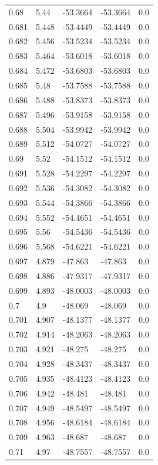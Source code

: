 \begin{table}[H]
\begin{tabular}{lllll}
0.68 & 5.44 & -53.3664 & -53.3664 & 0.0 \\
0.681 & 5.448 & -53.4449 & -53.4449 & 0.0 \\
0.682 & 5.456 & -53.5234 & -53.5234 & 0.0 \\
0.683 & 5.464 & -53.6018 & -53.6018 & 0.0 \\
0.684 & 5.472 & -53.6803 & -53.6803 & 0.0 \\
0.685 & 5.48 & -53.7588 & -53.7588 & 0.0 \\
0.686 & 5.488 & -53.8373 & -53.8373 & 0.0 \\
0.687 & 5.496 & -53.9158 & -53.9158 & 0.0 \\
0.688 & 5.504 & -53.9942 & -53.9942 & 0.0 \\
0.689 & 5.512 & -54.0727 & -54.0727 & 0.0 \\
0.69 & 5.52 & -54.1512 & -54.1512 & 0.0 \\
0.691 & 5.528 & -54.2297 & -54.2297 & 0.0 \\
0.692 & 5.536 & -54.3082 & -54.3082 & 0.0 \\
0.693 & 5.544 & -54.3866 & -54.3866 & 0.0 \\
0.694 & 5.552 & -54.4651 & -54.4651 & 0.0 \\
0.695 & 5.56 & -54.5436 & -54.5436 & 0.0 \\
0.696 & 5.568 & -54.6221 & -54.6221 & 0.0 \\
0.697 & 4.879 & -47.863 & -47.863 & 0.0 \\
0.698 & 4.886 & -47.9317 & -47.9317 & 0.0 \\
0.699 & 4.893 & -48.0003 & -48.0003 & 0.0 \\
0.7 & 4.9 & -48.069 & -48.069 & 0.0 \\
0.701 & 4.907 & -48.1377 & -48.1377 & 0.0 \\
0.702 & 4.914 & -48.2063 & -48.2063 & 0.0 \\
0.703 & 4.921 & -48.275 & -48.275 & 0.0 \\
0.704 & 4.928 & -48.3437 & -48.3437 & 0.0 \\
0.705 & 4.935 & -48.4123 & -48.4123 & 0.0 \\
0.706 & 4.942 & -48.481 & -48.481 & 0.0 \\
0.707 & 4.949 & -48.5497 & -48.5497 & 0.0 \\
0.708 & 4.956 & -48.6184 & -48.6184 & 0.0 \\
0.709 & 4.963 & -48.687 & -48.687 & 0.0 \\
0.71 & 4.97 & -48.7557 & -48.7557 & 0.0 \\

\end{tabular}
\end{table}
